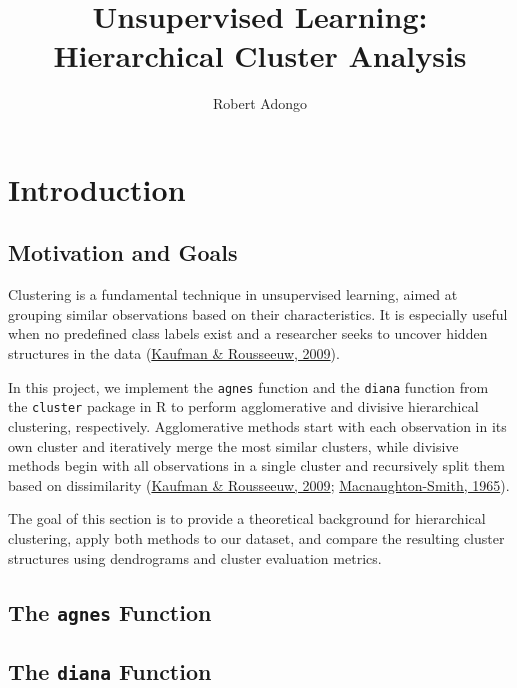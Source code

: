 \documentclass[
]{article}
\title{Unsupervised Learning: Hierarchical Cluster Analysis}
\author{Robert Adongo}
\date{}
\begin{document}
\maketitle

\hypertarget{introduction}{%
\section{Introduction}\label{introduction}}

\hypertarget{motivation-and-goals}{%
\subsection{Motivation and Goals}\label{motivation-and-goals}}

Clustering is a fundamental technique in unsupervised learning, aimed at
grouping similar observations based on their characteristics. It is
especially useful when no predefined class labels exist and a researcher
seeks to uncover hidden structures in the data
(\protect\hyperlink{ref-kaufman2009finding}{Kaufman \& Rousseeuw,
2009}).

In this project, we implement the \texttt{agnes} function and the
\texttt{diana} function from the \texttt{cluster} package in R to
perform agglomerative and divisive hierarchical clustering,
respectively. Agglomerative methods start with each observation in its
own cluster and iteratively merge the most similar clusters, while
divisive methods begin with all observations in a single cluster and
recursively split them based on dissimilarity
(\protect\hyperlink{ref-kaufman2009finding}{Kaufman \& Rousseeuw, 2009};
\protect\hyperlink{ref-macnaughton1965some}{Macnaughton-Smith, 1965}).

The goal of this section is to provide a theoretical background for
hierarchical clustering, apply both methods to our dataset, and compare
the resulting cluster structures using dendrograms and cluster
evaluation metrics.

\hypertarget{the-agnes-function}{%
\subsection{\texorpdfstring{The \texttt{agnes}
Function}{The agnes Function}}\label{the-agnes-function}}

\hypertarget{the-diana-function}{%
\subsection{\texorpdfstring{The \texttt{diana}
Function}{The diana Function}}\label{the-diana-function}}
\end{document}
